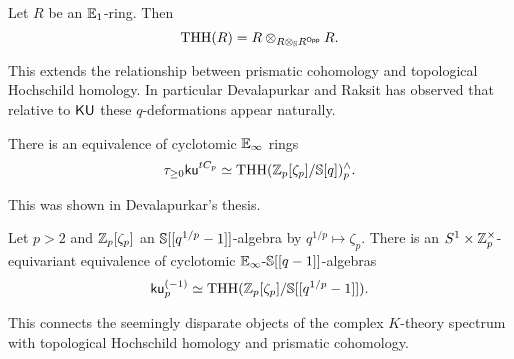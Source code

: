 \begin{definition}\label{def: THH}
    Let $R$ be an $\mathbb{E}_{1}$-ring. Then 
    $$\mathrm{THH}(R)=R\otimes_{R\otimes_{\mathbb{S}}R^{\mathsf{Opp}}}R.$$
\end{definition}
This extends the relationship between prismatic cohomology and topological Hochschild homology. In particular Devalapurkar and Raksit has observed that relative to $\mathsf{KU}$ these $q$-deformations appear naturally. 
\begin{conjecture}
    There is an equivalence of cyclotomic $\mathbb{E}_{\infty}$ rings 
    $$\tau_{\geq0}\mathsf{ku}^{tC_{p}}\simeq\mathrm{THH}(\mathbb{Z}_{p}[\zeta_{p}]/\mathbb{S}[q])^{\wedge}_{p}.$$
\end{conjecture}
This was shown in Devalapurkar's thesis.  
\begin{theorem}
    Let $p>2$ and $\mathbb{Z}_{p}[\zeta_{p}]$ an $\mathbb{S}[[q^{1/p}-1]]$-algebra by $q^{1/p}\mapsto\zeta_{p}$. There is an $S^{1}\times\mathbb{Z}_{p}^{\times}$-equivariant equivalence of cyclotomic $\mathbb{E}_{\infty}\text{-}\mathbb{S}[[q-1]]$-algebras 
    $$\mathsf{ku}_{p}^{(-1)}\simeq\mathrm{THH}(\mathbb{Z}_{p}[\zeta_{p}]/\mathbb{S}[[q^{1/p}-1]]).$$
\end{theorem}
This connects the seemingly disparate objects of the complex $K$-theory spectrum with topological Hochschild homology and prismatic cohomology. 

